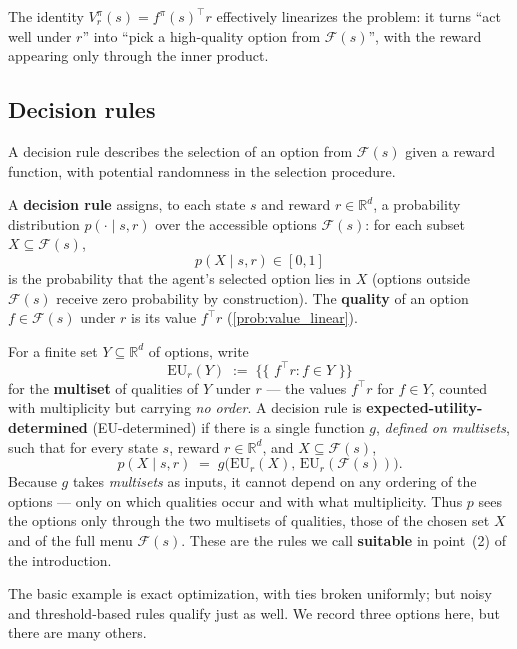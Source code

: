 \documentclass[11pt]{article}
\newcommand{\R}{\mathbb{R}}
\newcommand{\F}{\mathcal{F}}       %
\newcommand{\mset}[1]{\{\!\{\,#1\,\}\!\}}   %
\begin{document}
The identity $V^\pi_r(s) = f^\pi(s)^\top r$ effectively linearizes the problem: it turns
``act well under $r$'' into ``pick a high-quality option from $\F(s)$'', with the reward
appearing only through the inner product. 

\subsection*{Decision rules}

A decision rule describes the selection of an option from $\F(s)$ given a reward function, with potential randomness in the selection procedure. 

\begin{definition}\label{def:decision_rule}
A \textbf{decision rule} assigns, to each state $s$ and reward $r \in \R^d$, a probability
distribution $p(\cdot \mid s, r)$ over the accessible options $\F(s)$: for each subset
$X \subseteq \F(s)$,
$$
p(X \mid s, r) \in [0,1]
$$
is the probability that the agent's selected option lies in $X$ (options outside $\F(s)$
receive zero probability by construction). The \textbf{quality} of an option $f \in \F(s)$
under $r$ is its value $f^\top r$ (\cref{prob:value_linear}).
\end{definition}

\begin{definition}\label{def:eu_determined}
For a finite set $Y \subseteq \R^d$ of options, write
$$
\mathrm{EU}_r(Y) \;:=\; \mset{\, f^\top r : f \in Y \,}
$$
for the \textbf{multiset} of qualities of $Y$ under $r$ --- the values $f^\top r$ for
$f \in Y$, counted with multiplicity but carrying \emph{no order}. A decision rule is
\textbf{expected-utility-determined} (EU-determined) if there is a single function $g$,
\emph{defined on multisets}, such that for every state $s$, reward $r \in \R^d$, and
$X \subseteq \F(s)$,
$$
p(X \mid s, r) \;=\; g\bigl(\mathrm{EU}_r(X),\, \mathrm{EU}_r(\F(s))\bigr).
$$
Because $g$ takes \emph{multisets} as inputs, it cannot depend on any ordering of the
options --- only on which qualities occur and with what multiplicity. Thus $p$ sees the
options only through the two multisets of qualities, those of the chosen set $X$ and of the
full menu $\F(s)$. These are the rules we call \textbf{suitable} in point~(2) of the
introduction.
\end{definition}

The basic example is exact optimization, with ties broken uniformly; but noisy and
threshold-based rules qualify just as well. We record three options here, but there are many others.
\end{document}
